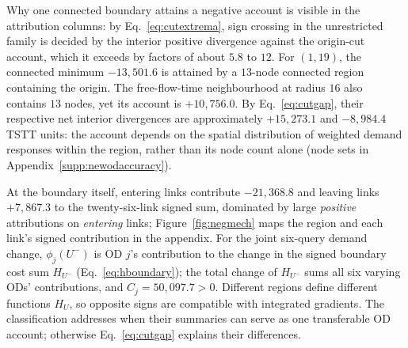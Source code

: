 Why one connected boundary attains a negative account is visible in
the attribution columns: by Eq.~\eqref{eq:cutextrema}, sign crossing
in the unrestricted family is decided by the interior positive
divergence against the origin-cut
account, which it exceeds by factors of about $5.8$ to $12$. For
$(1,19)$, the connected
minimum $-13{,}501.6$ is attained by a $13$-node connected region
containing the origin. The free-flow-time neighbourhood at radius $16$
also contains $13$ nodes, yet its account is $+10{,}756.0$.
By Eq.~\eqref{eq:cutgap}, their respective net interior divergences
are approximately $+15{,}273.1$ and $-8{,}984.4$ TSTT units:
the account depends on the spatial distribution of weighted demand
responses within the region, rather than its node count alone
(node sets in Appendix~\ref{supp:newodaccuracy}).

At the boundary itself, entering links contribute $-21{,}368.8$ and
leaving links $+7{,}867.3$ to the twenty-six-link signed sum,
dominated by large \emph{positive} attributions on
\emph{entering} links; Figure~\ref{fig:negmech} maps the region and
each link's signed contribution in the appendix. For
the joint six-query demand change, $\phi_j(U^-)$ is OD $j$'s
contribution to the change in the signed boundary cost sum $H_{U^-}$
(Eq.~\eqref{eq:hboundary}); the total change of $H_{U^-}$ sums all six
varying ODs' contributions, and $C_j=50{,}097.7>0$.
Different regions define different functions $H_U$, so opposite signs
are compatible with integrated gradients. The classification addresses
when their summaries can serve as one transferable OD account;
otherwise Eq.~\eqref{eq:cutgap} explains their differences.


